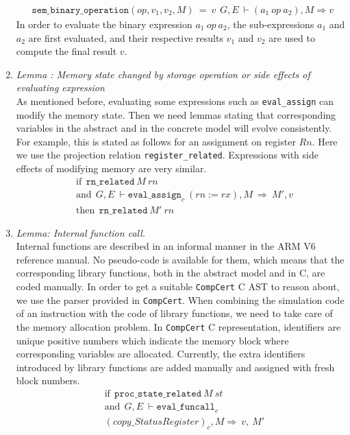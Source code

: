 \documentclass[twocolumn]{article}
\newcommand{\compcert}{\texttt{CompCert}\xspace}
\begin{document}
\begin{enumerate}
\[{\begin{array}{l}
\texttt{sem\_binary\_operation}(op,v_1,v_2,M)~=~v
\end{array}}
{G,E~\vdash (a_1~op~a_2),M\Rightarrow v}
\]
In order to evaluate the binary expression $a_1~op~a_2$,
the sub-expressions $a_1$ and $a_2$ are first evaluated,
and their respective results $v_1$ and $v_2$ are used
to compute the final result $v$.
\item
  {\it Lemma : Memory state changed by storage operation or side effects of evaluating expression}\\
  As mentioned before, evaluating some expressions such as
  \texttt{eval\_assign} can modify the memory state.  Then we need
  lemmas stating that corresponding variables in the abstract and in
  the concrete model will evolve consistently.  For example, this is
  stated as follows for an assignment on register $Rn$.  Here we use
  the projection relation \texttt{register\_related}. Expressions with
  side effects of modifying memory are very similar.
\begin{align*}
&\textrm{if} ~~ \texttt{rn\_related}~M~rn\\
&\textrm{and}~~  G,E~\vdash \texttt{eval\_assign}_c~(rn:=rx),M~\Rightarrow~ M',v\\
&\textrm{then} ~~ \texttt{rn\_related}~M'~rn
\end{align*}
\item
  \textit{Lemma: Internal function call.}\\
  Internal functions are described in an informal manner in the ARM V6
  reference manual.  No pseudo-code is available for them, which means
  that the corresponding library functions, both in the abstract model
  and in C, are coded manually.  In order to get a suitable
  \compcert C AST to reason about, we use the parser provided in
  \compcert.  When combining the simulation code of an instruction
  with the code of library functions, we need to take care of the
  memory allocation problem.  In \compcert C representation,
  identifiers are unique positive numbers which indicate the memory
  block where corresponding variables are allocated.  Currently, the
  extra identifiers introduced by library functions are added manually
  and assigned with fresh block numbers.
\label{page:libfunast}
\begin{align*}
&\textrm{if} ~~  \texttt{proc\_state\_related}~M~st \\
&\textrm{and} ~~ G,E~\vdash \texttt{eval\_funcall}_c\\
&        (copy\_StatusRegister)_c,M\Rightarrow~v,~M'\\

\end{align*}
\end{enumerate}
\end{document}
